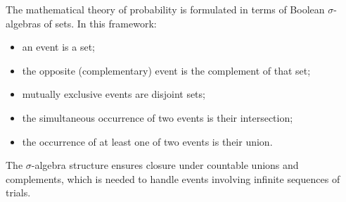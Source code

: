The mathematical theory of probability is formulated in terms of Boolean $\sigma$-algebras of sets. In this framework:
\begin{itemize}
\item an event is a set;
\item the opposite (complementary) event is the complement of that set;
\item mutually exclusive events are disjoint sets;
\item the simultaneous occurrence of two events is their intersection;
\item the occurrence of at least one of two events is their union.
\end{itemize}
The $\sigma$-algebra structure ensures closure under countable unions and complements, which is needed to handle events involving infinite sequences of trials.
